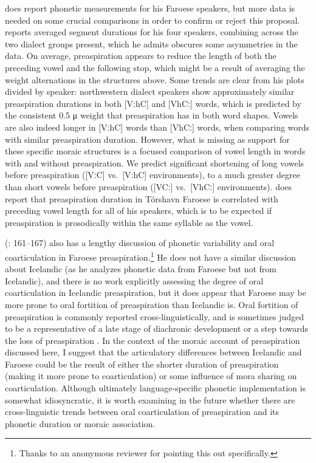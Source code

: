 \documentclass[output=paper,colorlinks,citecolor=brown]{langscibook}
\begin{document}
\citet{Helgason2002} does report phonetic measurements for his Faroese speakers, but more data is needed on some crucial comparisons in order to confirm or reject this proposal. \citeauthor{Helgason2002} reports averaged segment durations for his four speakers, combining across the two dialect groups present, which he admits obscures some asymmetries in the data. On average, preaspiration appears to reduce the length of both the preceding vowel and the following stop, which might be a result of averaging the weight alternations in the structures above. Some trends are clear from his plots divided by speaker: northwestern dialect speakers show approximately similar preaspiration durations in both [Vː{h}C] and [V{h}Cː] words, which is predicted by the consistent 0.5 μ weight that preaspiration has in both word shapes. Vowels are also indeed longer in [Vː{h}C] words than [V{h}Cː] words, when comparing words with similar preaspiration duration. 
However, what is missing as support for these specific moraic structures is a focused comparison of vowel length in words with and without preaspiration. We predict significant shortening of long vowels before preaspiration ([VːC] vs.\ [Vː{h}C] environments), to a much greater degree than short vowels before preaspiration ([VCː] vs.\ [V{h}Cː] environments). \citet{Helgason2002} does report that preaspiration duration in Tórshavn Faroese is correlated with preceding vowel length for all of his speakers, which is to be expected if preaspiration is prosodically within the same syllable as the vowel. %

{\citeauthor{Helgason2002}} (\citeyear{Helgason2002}: 161--167) also has a lengthy discussion of phonetic variability and oral coarticulation in Faroese preaspiration.\footnote{Thanks to an anonymous reviewer for pointing this out specifically.} He does not have a similar discussion about Icelandic (as he analyzes phonetic data from Faroese but not from Icelandic), and there is no work explicitly assessing the degree of oral coarticulation in Icelandic preaspiration, but it does appear that Faroese may be more prone to oral fortition of preaspiration than Icelandic is. Oral fortition of preaspiration is commonly reported cross-linguistically, and is sometimes judged to be a representative of a late stage of diachronic development or a step towards the loss of preaspiration \citep[e.g.,][]{Silverman2003,Clayton:2010}. In the context of the moraic account of preaspiration discussed here, I suggest that the articulatory differences between Icelandic and Faroese could be the result of either the shorter duration of preaspiration (making it more prone to coarticulation) or some influence of mora sharing on coarticulation. Although ultimately language-specific phonetic implementation is somewhat idiosyncratic, it is worth examining in the future whether there are cross-linguistic trends between oral coarticulation of preaspiration and its phonetic duration or moraic association.
\end{document}
